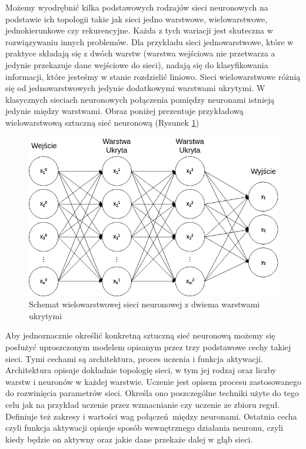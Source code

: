 \documentclass[12pt, oneside, a4paper]{report}
\begin{document}
Możemy wyodrębnić kilka podstawowych rodzajów sieci neuronowych na podstawie ich topologii takie jak sieci jedno warstwowe, wielowarstwowe, jednokierunkowe czy rekurencyjne. Każda z tych wariacji jest skuteczna w rozwiązywaniu innych problemów. Dla przykładu sieci jednowarstwowe, które w praktyce składają się z dwóch warstw (warstwa wejściowa nie przetwarza a jedynie przekazuje dane wejściowe do sieci), nadają się do klasyfikowania informacji, które jesteśmy w stanie rozdzielić liniowo. Sieci wielowarstwowe różnią się od jednowarstwowych jedynie dodatkowymi warstwami ukrytymi. W klasycznych sieciach neuronowych połączenia pomiędzy neuronami istnieją jedynie między warstwami. Obraz poniżej prezentuje przykładową wielowarstwową sztuczną sieć neuronową (Rysunek \ref{fig: 2.2})

\begin{figure}[h]
	\centering
	\includegraphics[width=12cm]{fig212.png}
	\caption{Schemat wielowarstwowej sieci neuronowej z dwiema warstwami ukrytymi}
	\label{fig: 2.2}
\end{figure}

Aby jednoznacznie określić konkretną sztuczną sieć neuronową możemy się posłużyć uproszczonym modelem opisanym przez trzy podstawowe cechy takiej sieci. Tymi cechami są architektura, proces uczenia i funkcja aktywacji. Architektura opisuje dokładnie topologię sieci, w tym jej rodzaj oraz liczby warstw i neuronów w każdej warstwie. Uczenie jest opisem procesu zastosowanego do rozwinięcia parametrów sieci. Określa ono poszczególne techniki użyte do tego celu jak na przykład uczenie przez wzmacnianie czy uczenie ze zbioru reguł. Definiuje też zakresy i wartości wag połączeń między neuronami. Ostatnia cecha czyli funkcja aktywacji opisuje sposób wewnętrznego działania neuronu, czyli kiedy będzie on aktywny oraz jakie dane przekaże dalej w głąb sieci.
\end{document}
